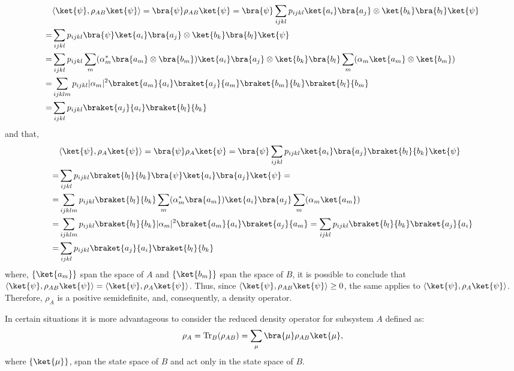 \begin{align*}
  &\langle \ket{\psi}, \rho_{AB} \ket{\psi} \rangle = \bra{\psi} \rho_{AB} \ket{\psi} = \bra{\psi} \sum_{ijkl} p_{ijkl} \ket{a_i} \bra{a_j}  \otimes \ket{b_k} \bra{b_l} \ket{\psi} \\ 
  = &\sum_{ijkl} p_{ijkl} \bra{\psi} \ket{a_i} \bra{a_j}  \otimes \ket{b_k} \bra{b_l} \ket{\psi} \\
  = & \sum_{ijkl} p_{ijkl} \sum_m (\alpha_{m}^{*} \bra{a_m} \otimes \bra{b_m}) \ket{a_i} \bra{a_j} \otimes \ket{b_k} \bra{b_l}  \sum_m (\alpha_{m}  \ket{a_m} \otimes \ket{b_m} )\\
  = & \sum_{ijklm} p_{ijkl} |\alpha_m|^{2} \braket{a_m}{a_i} \braket{a_j}{a_m} \braket{b_m}{b_k} \braket{b_l}{b_m} \\
  = & \sum_{ijkl}  p_{ijkl}  \braket{a_j}{a_i} \braket{b_l}{b_k} \\
\end{align*}
and that,
\begin{align*}
  &\langle \ket{\psi}, \rho_{A} \ket{\psi} \rangle = \bra{\psi} \rho_{A} \ket{\psi}
  = \bra{\psi} \sum_{ijkl} p_{ijkl} \ket{a_i}\bra{a_j} \braket{b_l}{b_k} \ket{\psi} \\
  = & \sum_{ijkl} p_{ijkl}  \braket{b_l}{b_k}  \bra{\psi} \ket{a_i}\bra{a_j}\ket{\psi} = \\
  = & \sum_{ijklm} p_{ijkl} \braket{b_l}{b_k} \sum_m (\alpha_{m}^{*} \bra{a_m}) \ket{a_i}\bra{a_j} \sum_m (\alpha_{m}  \ket{a_m} ) \\
  = & \sum_{ijklm} p_{ijkl} \braket{b_l}{b_k} |\alpha_m|^{2} \braket{a_m}{a_i} \braket{a_j}{a_m} = \sum_{ijkl} p_{ijkl} \braket{b_l}{b_k} \braket{a_j}{a_i} \\
  = & \sum_{ijkl} p_{ijkl}  \braket{a_j}{a_i} \braket{b_l}{b_k}
\end{align*}
where, $\{\ket{a_m}\}$ span the space of $A$ and $\{\ket{b_m}\}$ span the space of $B$, it is possible to conclude that $\langle \ket{\psi}, \rho_{AB} \ket{\psi} \rangle = \langle \ket{\psi}, \rho_{A} \ket{\psi} \rangle$. Thus, since $\langle \ket{\psi}, \rho_{AB} \ket{\psi} \rangle \geq 0$, the same applies to $\langle \ket{\psi}, \rho_{A} \ket{\psi} \rangle$. Therefore, $\rho_{A}$ is a positive semidefinite, and, consequently, a density operator.


In certain situations it is more advantageous to consider the reduced density operator for subsystem $A$ defined as:
\begin{equation*}
  \rho_{A} = \text{Tr}_{B}(\rho_{AB}) = \sum_{\mu} \bra{\mu} \rho_{AB} \ket{\mu},
\end{equation*}
where $\{\ket{\mu}\}$, span the state space of $B$ and act only in the state space of $B$. 

